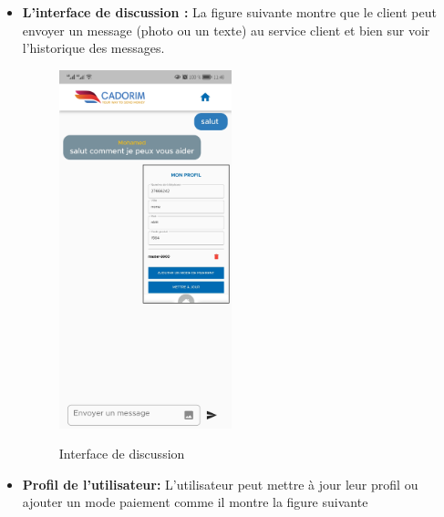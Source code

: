 \begin{itemize}[label=$\ast$]
\item \textbf{L’interface de discussion
	:} La figure suivante montre que le client peut envoyer un message (photo ou un texte) au service client et bien sur voir l'historique des messages.
	\begin{figure}%
	\centering
	{{\includegraphics[width=5cm]{./Template LaTeX/Images/c.jpg} }}%
	\caption{Interface de discussion}%
	\label{fig:example}%
\end{figure}
\newpage
\item \textbf{Profil de l'utilisateur:} L'utilisateur peut mettre à jour leur profil ou ajouter un mode paiement comme il montre la figure suivante
\begin{figure}
	\centering
	\begin{subfigure}[b]{0.3\textwidth}
		\centering

\end{subfigure}
\end{figure}
\end{itemize}
